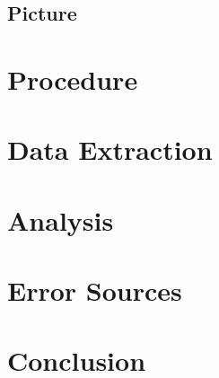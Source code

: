 \documentclass[12pt,a4paper]{article}
\begin{document}
\subsection{Picture}
\vspace{1cm}
\section{Procedure}
\vspace{1cm}
\section{Data Extraction}
\vspace{1cm}
\section{Analysis}
\vspace{1cm}
\section{Error Sources}
\vspace{1cm}
\section{Conclusion}
\end{document}
